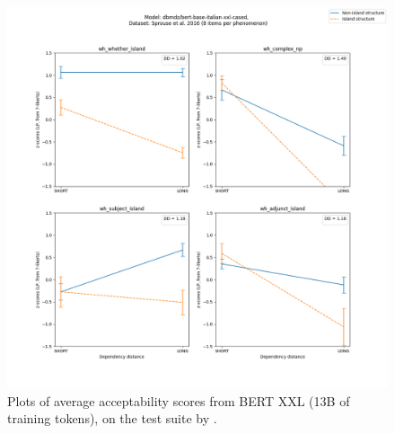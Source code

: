 \begin{figure}[p]
	\centering
	\includegraphics[width=1\textwidth]{images/Chapter1/Sprouse_wh_dbmdz_bert-base-italian-xxl-cased_LP-zscores-likert-2022-09-14_h17m27s24.png} 
	\caption{Plots of average acceptability scores from BERT XXL (13B of training tokens), on the test suite by \citet{sprouse2016experimental}.}
	\label{fig:sprouse_bert_lp} 
	\medskip
\end{figure}	

